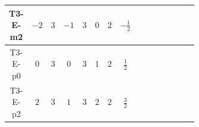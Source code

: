 \documentclass[8pt]{article}
\begin{document}
\begin{landscape}
\begin{longtable}{@{}cccccccc >{\raggedright\arraybackslash}p{0.21\linewidth} >{\raggedright\arraybackslash}p{0.21\linewidth} >{\raggedright\arraybackslash}p{0.21\linewidth}@{}}
\midrule
T3-E-m2 & $-2$ & $3$ & $-1$ & $3$ & $0$ & $2$ & $-\frac{1}{2}$ & \scriptsize\adjustbox{max width=\linewidth}{$\begin{gathered} +D_{\mu _1}\left(S_{2,j_1}\right){}^{\dagger } D_{\mu _1}\left(S_{2,j_1}\right)\end{gathered}$} & \scriptsize\adjustbox{max width=\linewidth}{$\begin{gathered} -\overline{F_{j_1,r_1}}\, F_{j_1,r_1} M_F\end{gathered}$} & \scriptsize\adjustbox{max width=\linewidth}{$\begin{gathered} +i \overline{F_{j_1,r_1}}\, \gamma ^{\mu _1}\, D_{\mu _1}\left(F_{j_1,r_1}\right)\end{gathered}$} \\
\midrule
T3-E-p0 & $0$ & $3$ & $0$ & $3$ & $1$ & $2$ & $\frac{1}{2}$ & \scriptsize\adjustbox{max width=\linewidth}{$\begin{gathered} +D_{\mu _1}\left(S_{2,j_1}\right){}^{\dagger } D_{\mu _1}\left(S_{2,j_1}\right)\end{gathered}$} & \scriptsize\adjustbox{max width=\linewidth}{$\begin{gathered} -\overline{F_{j_1,r_1}}\, F_{j_1,r_1} M_F\end{gathered}$} & \scriptsize\adjustbox{max width=\linewidth}{$\begin{gathered} +i \overline{F_{j_1,r_1}}\, \gamma ^{\mu _1}\, D_{\mu _1}\left(F_{j_1,r_1}\right)\end{gathered}$} \\
\midrule
T3-E-p2 & $2$ & $3$ & $1$ & $3$ & $2$ & $2$ & $\frac{3}{2}$ & \scriptsize\adjustbox{max width=\linewidth}{$\begin{gathered} +D_{\mu _1}\left(S_{2,j_1}\right){}^{\dagger } D_{\mu _1}\left(S_{2,j_1}\right)\end{gathered}$} & \scriptsize\adjustbox{max width=\linewidth}{$\begin{gathered} -\overline{F_{j_1,r_1}}\, F_{j_1,r_1} M_F\end{gathered}$} & \scriptsize\adjustbox{max width=\linewidth}{$\begin{gathered} +i \overline{F_{j_1,r_1}}\, \gamma ^{\mu _1}\, D_{\mu _1}\left(F_{j_1,r_1}\right)\end{gathered}$} \\
\midrule
\bottomrule
\end{longtable}
\clearpage

\end{landscape}
\end{document}
